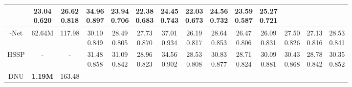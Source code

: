 \documentclass{article}
\begin{document}
\begin{table*}[t]
{\begin{tabular}{cccccccccccccc}
			&\tabincell{c}{23.04\\0.620}
			&\tabincell{c}{26.62\\0.818}
			&\tabincell{c}{34.96\\0.897}
			&\tabincell{c}{23.94\\0.706}
			&\tabincell{c}{22.38\\0.683}
			&\tabincell{c}{24.45\\0.743}
			&\tabincell{c}{22.03\\0.673}
			&\tabincell{c}{24.56\\0.732}
			&\tabincell{c}{23.59\\0.587}
			&\tabincell{c}{25.27\\0.721}
			\\
			\midrule
			-Net \cite{lambda}
			& 62.64M
			& 117.98
			&\tabincell{c}{30.10\\0.849}
			&\tabincell{c}{28.49\\0.805}
			&\tabincell{c}{27.73\\0.870}
			&\tabincell{c}{37.01\\0.934}
			&\tabincell{c}{26.19\\0.817}
			&\tabincell{c}{28.64\\0.853}
			&\tabincell{c}{26.47\\0.806}
			&\tabincell{c}{26.09\\0.831}
			&\tabincell{c}{27.50\\0.826}
			&\tabincell{c}{27.13\\0.816}
			&\tabincell{c}{28.53\\0.841}
			\\
			\midrule
			HSSP \cite{hssp}
			& - 
			& -
			&\tabincell{c}{31.48\\0.858}
			&\tabincell{c}{31.09\\0.842}
			&\tabincell{c}{28.96\\0.823}
			&\tabincell{c}{34.56\\0.902}
			&\tabincell{c}{28.53\\0.808}
			&\tabincell{c}{30.83\\0.877}
			&\tabincell{c}{28.71\\0.824}
			&\tabincell{c}{30.09\\0.881}
			&\tabincell{c}{30.43\\0.868}
			&\tabincell{c}{28.78\\0.842}
			&\tabincell{c}{30.35\\0.852}
			\\
			\midrule
			DNU \cite{dnu}
			& \bf 1.19M
			& 163.48

\end{tabular}}
\end{table*}
\end{document}
